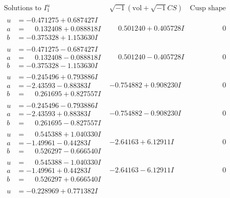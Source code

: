 \documentclass[1p]{elsarticle_modified}
\theoremstyle{definition}
\newcommand{\I}{\sqrt{-1}}
\begin{document}
$$\begin{array}{c|c|c}
\text{Solutions to }I^u_{1}& \I (\text{vol} + \sqrt{-1}CS) & \text{Cusp shape}\\
 \hline 
\begin{aligned}
u &= -0.471275 + 0.687427 I \\
a &= \phantom{-}0.132408 + 0.088818 I \\
b &= -0.375328 + 1.153630 I\end{aligned}
 & \phantom{-}0.501240 + 0.405728 I & \phantom{-0.000000 } 0 \\ \hline\begin{aligned}
u &= -0.471275 - 0.687427 I \\
a &= \phantom{-}0.132408 - 0.088818 I \\
b &= -0.375328 - 1.153630 I\end{aligned}
 & \phantom{-}0.501240 - 0.405728 I & \phantom{-0.000000 } 0 \\ \hline\begin{aligned}
u &= -0.245496 + 0.793886 I \\
a &= -2.43593 - 0.88383 I \\
b &= \phantom{-}0.261695 + 0.827557 I\end{aligned}
 & -0.754882 + 0.908230 I & \phantom{-0.000000 } 0 \\ \hline\begin{aligned}
u &= -0.245496 - 0.793886 I \\
a &= -2.43593 + 0.88383 I \\
b &= \phantom{-}0.261695 - 0.827557 I\end{aligned}
 & -0.754882 - 0.908230 I & \phantom{-0.000000 } 0 \\ \hline\begin{aligned}
u &= \phantom{-}0.545388 + 1.040330 I \\
a &= -1.49961 - 0.44283 I \\
b &= \phantom{-}0.526297 - 0.666540 I\end{aligned}
 & -2.64163 + 6.12911 I & \phantom{-0.000000 } 0 \\ \hline\begin{aligned}
u &= \phantom{-}0.545388 - 1.040330 I \\
a &= -1.49961 + 0.44283 I \\
b &= \phantom{-}0.526297 + 0.666540 I\end{aligned}
 & -2.64163 - 6.12911 I & \phantom{-0.000000 } 0 \\ \hline\begin{aligned}
u &= -0.228969 + 0.771382 I \\

\end{aligned}
\end{array}$$
\end{document}
